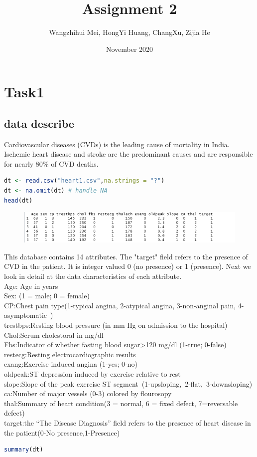 \documentclass{article}
\title{Assignment 2}
\author{Wangzhihui Mei, HongYi Huang, ChangXu, Zijia He}
\date{November 2020}
\begin{document}
\maketitle
\section{Task1}
\subsection{data describe}
\setlength{\parindent}{0pt}
Cardiovascular diseases (CVDs) is the leading cause of mortality in India. Ischemic heart disease and stroke are the predominant causes and are responsible for nearly 80\% of CVD deaths. 

\begin{lstlisting}[language=R]
dt <- read.csv("heart1.csv",na.strings = "?")
dt <- na.omit(dt) # handle NA
head(dt)
\end{lstlisting} 

\begin{figure}[H]
  \centering
  \includegraphics[width=1\textwidth]{task1_1_dtHead.png} %
\end{figure}

This database contains 14 attributes. The "target" field refers to the presence of CVD in the patient. It is
integer valued 0 (no presence) or 1 (presence). Next we look in detail at the data characteristics of each attribute.
\\
Age: Age in years\\
Sex: (1 = male; 0 = female)\\
CP:Chest pain type(1-typical angina, 2-atypical angina, 3-non-anginal	pain, 4-asymptomatic )\\
trestbps:Resting blood pressure (in mm Hg on admission to the hospital)\\
Chol:Serum cholestoral in mg/dl\\
Fbs:Indicator of whether fasting blood sugar>120 mg/dl (1-true; 0-false)\\
restecg:Resting electrocardiographic results\\
exang:Exercise induced angina (1-yes; 0-no)\\
oldpeak:ST depression induced by exercise relative to rest\\
slope:Slope of the peak exercise ST segment (1-upsloping, 2-flat, 3-downsloping)\\
ca:Number of major vessels (0-3) colored by flourosopy\\
thal:Summary of heart condition(3 = normal, 6 = fixed defect, 7=reversable defect)\\
target:the “The Disease Diagnosis” field refers to the presence of heart disease in the patient(0-No presence,1-Presence) 
\begin{lstlisting}[language=R]
  summary(dt)
\end{lstlisting} 
  
\end{document}
